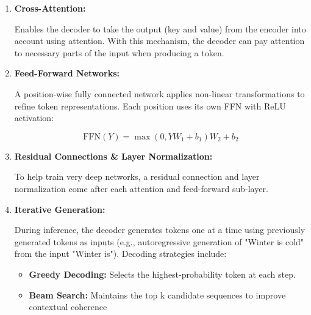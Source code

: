 \begin{enumerate}
        \begin{equation}
         {A}_i^l = \frac{ {Q}_i ( {K}_i)^\top}{\sqrt{d_k}} +  {R}_i^{l-1}
        \end{equation}

        \textbf{Purpose of Scaling:}\\
        The dot-products $ Q_i K_i^\top $ grow large in expectation as the dimension $ d_k $ increases, which can lead to small gradients when using activation functions like softmax. Dividing by $ \sqrt{d_k} $ normalizes the variance of the dot-products across different values of $ d_k $, stabilizing the gradients and preventing vanishing or exploding gradients during training.

        \textbf{Causal Masking}
        
        Future tokens are masked by setting their attention scores to $ -\infty $ in the attention matrix before applying softmax. This ensures that, during training or inference, the model cannot attend to subsequent tokens, thereby enforcing autoregressive generation.
        
    \item \textbf{Cross-Attention:}
    
    Enables the decoder to take the output (key and value) from the encoder into account using attention. With this mechanism, the decoder can pay attention to necessary parts of the input when producing a token.
    
    \item \textbf{Feed-Forward Networks:}
    
    A position-wise fully connected network applies non-linear transformations to refine token representations. Each position uses its own FFN with ReLU activation:

    \begin{equation}
        \text{FFN}( {Y}) = \max(0,  {Y}  {W}_1 +  {b}_1)  {W}_2 +  {b}_2
    \end{equation}

    
    \item \textbf{Residual Connections \& Layer Normalization:} 
    
    To help train very deep networks, a residual connection and layer normalization come after each attention and feed-forward sub-layer.
    
    \item \textbf{Iterative Generation:}
    
    During inference, the decoder generates tokens one at a time using previously generated tokens as inputs (e.g., autoregressive generation of "Winter is cold" from the input "Winter is"). Decoding strategies include:

    \begin{itemize}
        \item \textbf{Greedy Decoding: }Selects the highest-probability token at each step.
        \item \textbf{Beam Search: }Maintains the top k candidate sequences to improve contextual coherence
    \end{itemize}
\end{enumerate}

